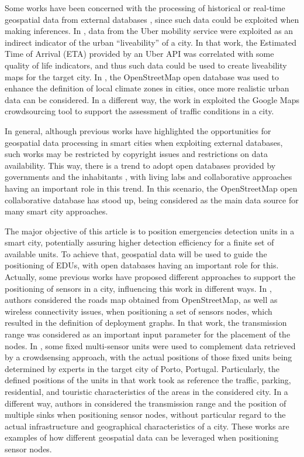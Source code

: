 \begin{refsection}
Some works have been concerned with the processing of historical or real-time geospatial data from external databases \cite{realtimegis}, since such data could be exploited when making inferences. In \cite{uberdata1}, data from the Uber mobility service were exploited as an indirect indicator of the urban ``liveability'' of a city. In that work, the Estimated Time of Arrival (ETA) provided by an Uber API was correlated with some quality of life indicators, and thus such data could be used to create liveability maps for the target city. In \cite{openstreetmap2}, the OpenStreetMap open database was used to enhance the definition of local climate zones in cities, once more realistic urban data can be considered. In a different way, the work in \cite{googlemaps} exploited the Google Maps crowdsourcing tool to support the assessment of traffic conditions in a city.

In general, although previous works have highlighted the opportunities for geospatial data processing in smart cities when exploiting external databases, such works may be restricted by copyright issues and restrictions on data availability. This way, there is a trend to adopt open databases provided by governments and the inhabitants \cite{opendatabase1}, with living labs \cite{livinglab} and collaborative approaches \cite{cityspeed} having an important role in this trend. In this scenario, the OpenStreetMap open collaborative database has stood up, being considered as the main data source for many smart city approaches. 

The major objective of this article is to position emergencies detection units in a smart city, potentially assuring higher detection efficiency for a finite set of available units. To achieve that, geospatial data will be used to guide the positioning of EDUs, with open databases having an important role for this. Actually, some previous works have proposed different approaches to support the positioning of sensors in a city, influencing this work in different ways. In \cite{positioning1}, authors considered the roads map obtained from OpenStreetMap, as well as wireless connectivity issues, when positioning a set of sensors nodes, which resulted in the definition of deployment graphs. In that work, the transmission range was considered as an important input parameter for the placement of the nodes. In \cite{positions2}, some fixed multi-sensor units were used to complement data retrieved by a crowdsensing approach, with the actual positions of those fixed units being determined by experts in the target city of Porto, Portugal. Particularly, the defined positions of the units in that work took as reference the traffic, parking, residential, and touristic characteristics of the areas in the considered city. In a different way, authors in \cite{positioning3} considered the transmission range and the position of multiple sinks when positioning sensor nodes, without particular regard to the actual infrastructure and geographical characteristics of a city. These works are examples of how different geospatial data can be leveraged when positioning sensor nodes.  


\end{refsection}
